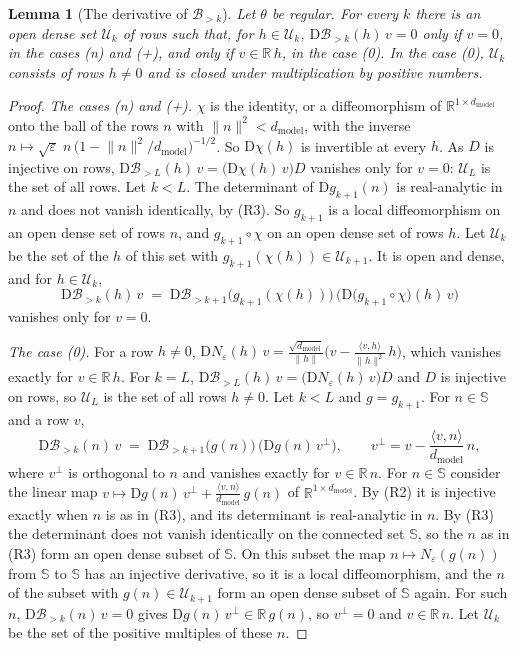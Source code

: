\documentclass[10pt]{article}
\newtheorem{lemma}[theorem]{Lemma}
\theoremstyle{definition}
\theoremstyle{remark}
\newcommand{\R}{\mathbb{R}}
\newcommand{\dm}{d_{\mathrm{model}}}
\newcommand{\Der}{\mathrm{D}}
\newcommand{\norm}[1]{\lVert #1\rVert}
\begin{document}
\begin{lemma}[The derivative of $\mathcal B_{>k}$]\label{lem:e0tailrank}
Let $\theta$ be regular. For every $k$ there is an open dense set $\mathcal U_k$ of rows such that, for $h \in \mathcal U_k$, $\Der\mathcal B_{>k}(h)\,v = 0$ only if $v = 0$, in the cases (n) and (+), and only if $v \in \R\,h$, in the case (0). In the case (0), $\mathcal U_k$ consists of rows $h \neq 0$ and is closed under multiplication by positive numbers.
\end{lemma}

\begin{proof}
\emph{The cases (n) and (+).} $\chi$ is the identity, or a diffeomorphism of $\R^{1\times\dm}$ onto the ball of the rows $n$ with $\norm{n}^2 < \dm$, with the inverse $n \mapsto \sqrt{\varepsilon}\;n\,\big(1 - \norm{n}^2/\dm\big)^{-1/2}$. So $\Der\chi(h)$ is invertible at every $h$. As $D$ is injective on rows, $\Der\mathcal B_{>L}(h)\,v = \big(\Der\chi(h)\,v\big)D$ vanishes only for $v = 0$: $\mathcal U_L$ is the set of all rows. Let $k < L$. The determinant of $\Der g_{k+1}(n)$ is real-analytic in $n$ and does not vanish identically, by (R3). So $g_{k+1}$ is a local diffeomorphism on an open dense set of rows $n$, and $g_{k+1}\circ\chi$ on an open dense set of rows $h$. Let $\mathcal U_k$ be the set of the $h$ of this set with $g_{k+1}(\chi(h)) \in \mathcal U_{k+1}$. It is open and dense, and for $h \in \mathcal U_k$,
\[
\Der\mathcal B_{>k}(h)\,v \;=\; \Der\mathcal B_{>k+1}\big(g_{k+1}(\chi(h))\big)\,\Big(\Der\big(g_{k+1}\circ\chi\big)(h)\,v\Big)
\]
vanishes only for $v = 0$.

\emph{The case (0).} For a row $h \neq 0$, $\Der N_\varepsilon(h)\,v = \frac{\sqrt{\dm}}{\norm{h}}\big(v - \frac{\langle v, h\rangle}{\norm{h}^2}\,h\big)$, which vanishes exactly for $v \in \R\,h$. For $k = L$, $\Der\mathcal B_{>L}(h)\,v = \big(\Der N_\varepsilon(h)\,v\big)D$ and $D$ is injective on rows, so $\mathcal U_L$ is the set of all rows $h \neq 0$. Let $k < L$ and $g = g_{k+1}$. For $n \in \mathbb S$ and a row $v$,
\[
\Der\mathcal B_{>k}(n)\,v \;=\; \Der\mathcal B_{>k+1}\big(g(n)\big)\,\big(\Der g(n)\,v^\perp\big), \qquad v^\perp = v - \frac{\langle v, n\rangle}{\dm}\,n ,
\]
where $v^\perp$ is orthogonal to $n$ and vanishes exactly for $v \in \R\,n$. For $n \in \mathbb S$ consider the linear map $v \mapsto \Der g(n)\,v^\perp + \frac{\langle v, n\rangle}{\dm}\,g(n)$ of $\R^{1\times\dm}$. By (R2) it is injective exactly when $n$ is as in (R3), and its determinant is real-analytic in $n$. By (R3) the determinant does not vanish identically on the connected set $\mathbb S$, so the $n$ as in (R3) form an open dense subset of $\mathbb S$. On this subset the map $n \mapsto N_\varepsilon(g(n))$ from $\mathbb S$ to $\mathbb S$ has an injective derivative, so it is a local diffeomorphism, and the $n$ of the subset with $g(n) \in \mathcal U_{k+1}$ form an open dense subset of $\mathbb S$ again. For such $n$, $\Der\mathcal B_{>k}(n)\,v = 0$ gives $\Der g(n)\,v^\perp \in \R\,g(n)$, so $v^\perp = 0$ and $v \in \R\,n$. Let $\mathcal U_k$ be the set of the positive multiples of these $n$.
\end{proof}
\end{document}
